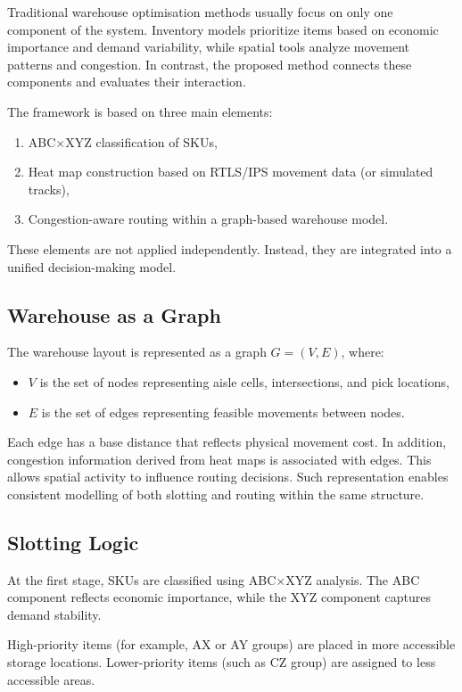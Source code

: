 \documentclass[12pt,a4paper]{article}
\begin{document}
Traditional warehouse optimisation methods usually focus on only one component of the
system. Inventory models prioritize items based on economic importance and demand
variability, while spatial tools analyze movement patterns and congestion. In contrast, the
proposed method connects these components and evaluates their interaction.

The framework is based on three main elements:
\begin{enumerate}
  \item ABC$\times$XYZ classification of SKUs,
  \item Heat map construction based on RTLS/IPS movement data (or simulated tracks),
  \item Congestion-aware routing within a graph-based warehouse model.
\end{enumerate}

These elements are not applied independently. Instead, they are integrated into a unified
decision-making model.

\subsection{Warehouse as a Graph}

The warehouse layout is represented as a graph $G = (V, E)$, where:
\begin{itemize}
  \item $V$ is the set of nodes representing aisle cells, intersections, and pick locations,
  \item $E$ is the set of edges representing feasible movements between nodes.
\end{itemize}

Each edge has a base distance that reflects physical movement cost. In addition, congestion
information derived from heat maps is associated with edges. This allows spatial activity to
influence routing decisions. Such representation enables consistent modelling of both slotting
and routing within the same structure.

\subsection{Slotting Logic}

At the first stage, SKUs are classified using ABC$\times$XYZ analysis. The ABC component
reflects economic importance, while the XYZ component captures demand stability.

High-priority items (for example, AX or AY groups) are placed in more accessible storage
locations. Lower-priority items (such as CZ group) are assigned to less accessible areas.
\end{document}
